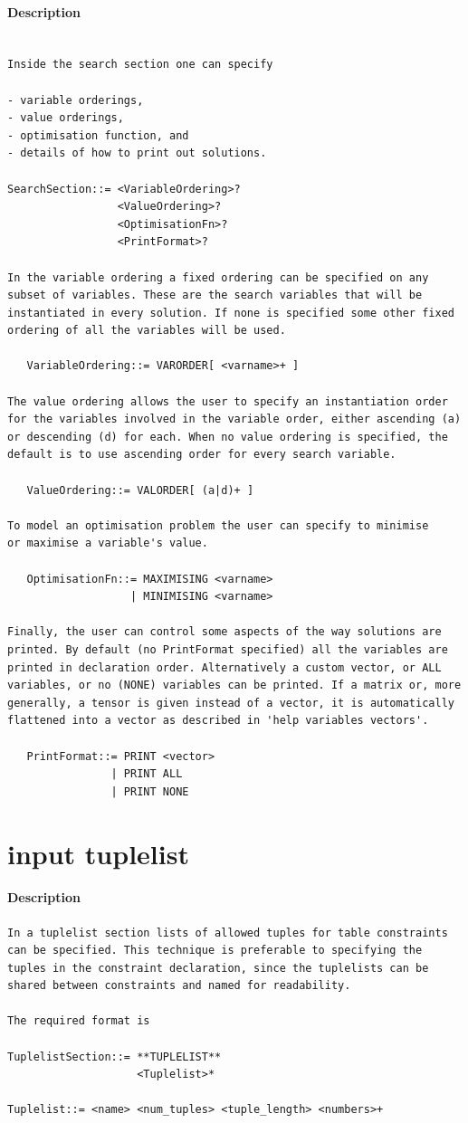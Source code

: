 \documentclass[oneside]{book}
\begin{document}
\paragraph{Description}
{\footnotesize
\begin{verbatim}

Inside the search section one can specify

- variable orderings, 
- value orderings,
- optimisation function, and
- details of how to print out solutions.

SearchSection::= <VariableOrdering>?
                 <ValueOrdering>?
                 <OptimisationFn>?
                 <PrintFormat>?

In the variable ordering a fixed ordering can be specified on any
subset of variables. These are the search variables that will be
instantiated in every solution. If none is specified some other fixed
ordering of all the variables will be used.

   VariableOrdering::= VARORDER[ <varname>+ ]

The value ordering allows the user to specify an instantiation order
for the variables involved in the variable order, either ascending (a)
or descending (d) for each. When no value ordering is specified, the
default is to use ascending order for every search variable.

   ValueOrdering::= VALORDER[ (a|d)+ ]

To model an optimisation problem the user can specify to minimise
or maximise a variable's value.

   OptimisationFn::= MAXIMISING <varname>
                   | MINIMISING <varname>

Finally, the user can control some aspects of the way solutions are
printed. By default (no PrintFormat specified) all the variables are
printed in declaration order. Alternatively a custom vector, or ALL
variables, or no (NONE) variables can be printed. If a matrix or, more
generally, a tensor is given instead of a vector, it is automatically
flattened into a vector as described in 'help variables vectors'.

   PrintFormat::= PRINT <vector>
                | PRINT ALL
                | PRINT NONE
\end{verbatim}
}
\section{input tuplelist}
\paragraph{Description}
{\footnotesize
\begin{verbatim}
In a tuplelist section lists of allowed tuples for table constraints
can be specified. This technique is preferable to specifying the
tuples in the constraint declaration, since the tuplelists can be
shared between constraints and named for readability.

The required format is

TuplelistSection::= **TUPLELIST**
                    <Tuplelist>*

Tuplelist::= <name> <num_tuples> <tuple_length> <numbers>+
\end{verbatim}
}
\end{document}
